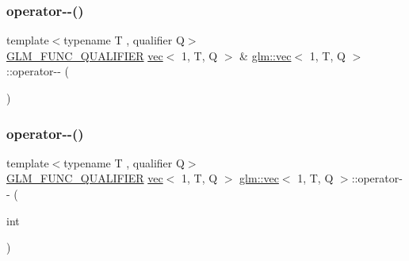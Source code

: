 \subsubsection{\texorpdfstring{operator-\/-\/()}{operator--()}\hspace{0.1cm}{\footnotesize\ttfamily [1/2]}}
{\footnotesize\ttfamily template$<$typename T , qualifier Q$>$ \\
\mbox{\hyperlink{setup_8hpp_a33fdea6f91c5f834105f7415e2a64407}{G\+L\+M\+\_\+\+F\+U\+N\+C\+\_\+\+Q\+U\+A\+L\+I\+F\+I\+ER}} \mbox{\hyperlink{structglm_1_1vec}{vec}}$<$ 1, T, Q $>$ \& \mbox{\hyperlink{structglm_1_1vec}{glm\+::vec}}$<$ 1, T, Q $>$\+::operator-\/-\/ (\begin{DoxyParamCaption}{ }\end{DoxyParamCaption})}

\mbox{\label{structglm_1_1vec_3_011_00_01_t_00_01_q_01_4_a5a8b3c0ef842a37c2ac49e9828231e6f}} 
\subsubsection{\texorpdfstring{operator-\/-\/()}{operator--()}\hspace{0.1cm}{\footnotesize\ttfamily [2/2]}}
{\footnotesize\ttfamily template$<$typename T , qualifier Q$>$ \\
\mbox{\hyperlink{setup_8hpp_a33fdea6f91c5f834105f7415e2a64407}{G\+L\+M\+\_\+\+F\+U\+N\+C\+\_\+\+Q\+U\+A\+L\+I\+F\+I\+ER}} \mbox{\hyperlink{structglm_1_1vec}{vec}}$<$ 1, T, Q $>$ \mbox{\hyperlink{structglm_1_1vec}{glm\+::vec}}$<$ 1, T, Q $>$\+::operator-\/-\/ (\begin{DoxyParamCaption}\item[{int}]{ }\end{DoxyParamCaption})}

\mbox{\label{structglm_1_1vec_3_011_00_01_t_00_01_q_01_4_ad8f1f7c45247e319031b4763b1b5d8e5}} 
